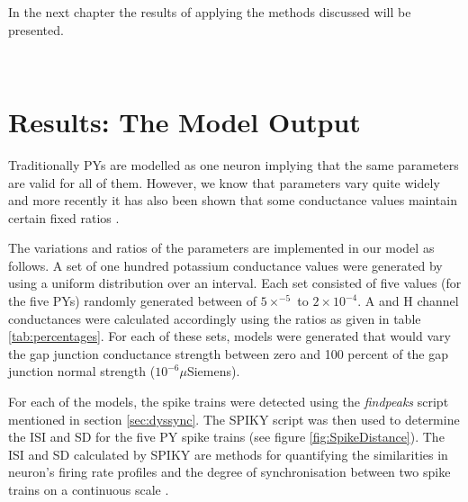 In the next chapter the results of applying the methods discussed will be presented.

\


\section{Results: The Model Output}

Traditionally \acp{PY} are modelled as one neuron implying that the same parameters are valid for all of them. However, we know that parameters vary quite widely and more recently it has also been shown that some conductance values maintain certain fixed ratios \cite{Temporal2012}. 

The variations and ratios of the parameters are implemented in our model as follows. A set of one hundred potassium conductance values were generated by using a uniform distribution over an interval. Each set consisted of five values (for the five \acp{PY}) randomly generated between of $5\times^{-5}$ to $2\times10^{-4}$. A and H channel conductances were calculated accordingly using the ratios as given in table \ref{tab:percentages}. For each of these sets, models were generated that would vary the gap junction conductance strength between zero and 100 percent of the gap junction normal strength ($10^{-6} \mu$Siemens).

For each of the models, the spike trains were detected using the \textit{findpeaks} \matlab script mentioned in section \ref{sec:dyssync}. The SPIKY \matlab script was then used to determine the \ac{ISI} and \ac{SD} for the five \ac{PY} spike trains (see figure \ref{fig:SpikeDistance}). The \ac{ISI} and \ac{SD} calculated by SPIKY are methods for quantifying the similarities in neuron's firing rate profiles and the degree of synchronisation between two spike trains on a continuous scale \cite{Kreuz2011}.

